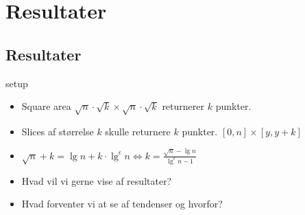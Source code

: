 \documentclass[pdf]{beamer}
\begin{document}
\section{Resultater}
\subsection{Resultater}

\begin{frame}{setup}
  \begin{itemize}
    \item Square area $\sqrt{n}\cdot\sqrt{k}\times\sqrt{n}\cdot\sqrt{k}$ returnerer $k$ punkter.
    \item Slices af størrelse $k$ skulle returnere $k$ punkter. $[0,n] \times [y, y+k]$
    \item $\sqrt{n}+k = \lg n + k\cdot\lg^\epsilon n \Leftrightarrow k = \frac{\sqrt{n}-\lg n}{\lg^\epsilon n -1}$
  \end{itemize}
\end{frame}

\begin{frame}
  \begin{itemize}
    \item Hvad vil vi gerne vise af resultater?
    \item Hvad forventer vi at se af tendenser og hvorfor?
  \end{itemize}
\end{frame}
\end{document}
